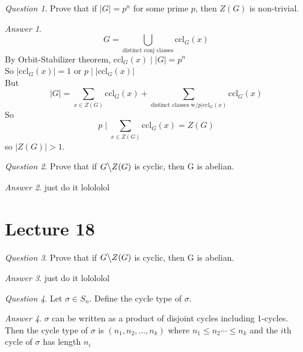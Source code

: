 \documentclass[]{article}
\theoremstyle{remark}
\theoremstyle{qnstyle}
\newtheorem{question}{Question}
\theoremstyle{answerstyle}
\newtheorem*{answer}{Answer}
\begin{document}
\begin{question}
    Prove that if $|G| = p^n$ for some prime $p$, then $Z(G)$ is non-trivial.
\end{question}
\begin{answer}
    $$G = \bigcup_{\text{distinct conj classes}} \text{ccl}_G(x)$$
    By Orbit-Stabilizer theorem, $\text{ccl}_G(x) \; \big \vert \; |G| = p^n$ \\
    So $|\text{ccl}_G(x)| = 1$ or $p\; \big \vert \; |\text{ccl}_G(x)|$\\
    But $$|G| = \sum_{x \in Z(G)}{\text{ccl}_G(x)} 
        + \sum_{\text{distinct classes w/} p\big\vert\text{ccl}_G(x)} {\text{ccl}_G(x)}$$
    So $$p\; \big \vert\; \sum_{x \in Z(G)}{\text{ccl}_G(x)} = Z(G)$$ so $|Z(G)| > 1$.
\end{answer}

\begin{question}
    Prove that if $G \big\backslash Z(G)$ is cyclic, then G is abelian.
\end{question}
\begin{answer}
    just do it lolololol
\end{answer}








\section* {Lecture 18}

\begin{question}
    Prove that if $G \big\backslash Z(G)$ is cyclic, then G is abelian.
\end{question}
\begin{answer}
    just do it lolololol
\end{answer}

\begin{question}
    Let $\sigma \in S_n$. Define the cycle type of $\sigma$.
\end{question}
\begin{answer}
    $\sigma$ can be written as a product of disjoint cycles including 1-cycles. Then the cycle type of $\sigma$ is 
    $(n_1, n_2, \ldots, n_k)$ where $n_1 \leq n_2 \cdots \leq n_k$ and the $i$th cycle of $\sigma$ has length $n_i$
\end{answer}
\end{document}
